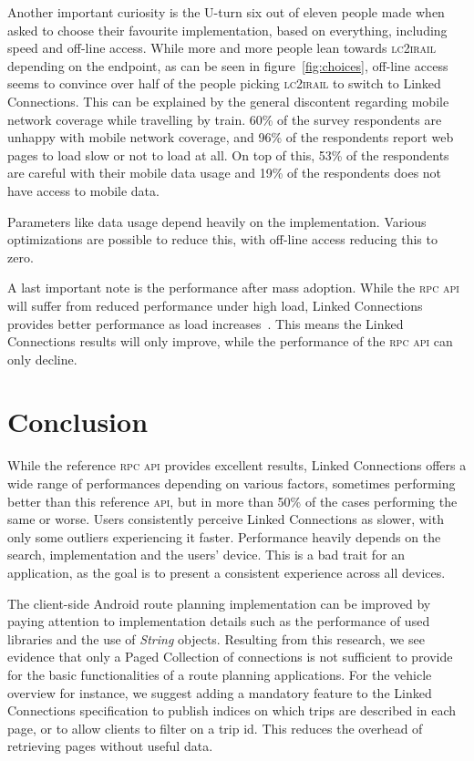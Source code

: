 \documentclass[twocolumn]{phdsymp} %
\begin{document}
Another important curiosity is the U-turn six out of eleven people made when asked to choose their favourite implementation, based on everything, including speed and off-line access.
While more and more people lean towards \textsc{lc2irail} depending on the endpoint, as can be seen in figure~\ref{fig:choices}, off-line access seems to convince over half of the people picking \textsc{lc2irail} to switch to Linked Connections. This can be explained by the general discontent regarding mobile network coverage while travelling by train. 60\% of the survey respondents are unhappy with mobile network coverage, and 96\% of the respondents report web pages to load slow or not to load at all. On top of this, 53\% of the respondents are careful with their mobile data usage and 19\% of the respondents does not have access to mobile data.

Parameters like data usage depend heavily on the implementation. Various optimizations are possible to reduce this, with off-line access reducing this to zero.

A last important note is the performance after mass adoption. While the \textsc{rpc} \textsc{api} will suffer from reduced performance under high load, Linked Connections provides better performance as load increases~\cite{colpaert17}. This means the Linked Connections results will only improve, while the performance of the \textsc{rpc} \textsc{api} can only decline.

\section{Conclusion}
While the reference \textsc{rpc} \textsc{api} provides excellent results, Linked Connections offers a wide range of performances depending on various factors, sometimes performing better than this reference \textsc{api}, but in more than 50\% of the cases performing the same or worse. Users consistently perceive Linked Connections as slower, with only some outliers experiencing it faster. Performance heavily depends on the search, implementation and the users’ device. This is a bad trait for an application, as the goal is to present a consistent experience across all devices.

The client-side Android route planning implementation can be improved by paying attention to implementation details such as the performance of used libraries and the use of \emph{String} objects. Resulting from this research, we see evidence that only a Paged Collection of connections is not sufficient to provide for the basic functionalities of a route planning applications. For the vehicle overview for instance, we suggest adding a mandatory feature to the Linked Connections specification to publish indices on which trips are described in each page, or to allow clients to filter on a trip id. This reduces the overhead of retrieving pages without useful data.
\end{document}

